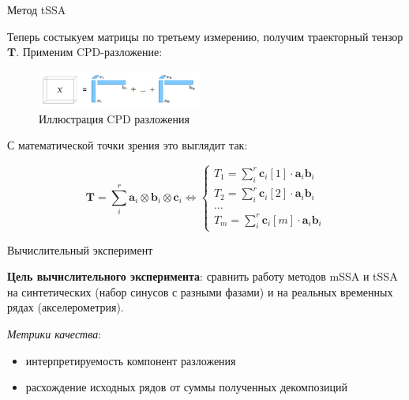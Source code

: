 	\begin{frame}{Метод tSSA}
		
		Теперь состыкуем матрицы по третьему измерению, получим траекторный тензор $ \mathbf{T} $. Применим CPD-разложение:
		
		\begin{figure}[h]
			\centering
			\includegraphics[width=0.48\textwidth, keepaspectratio]{../../figs/cpu_decomp}
			\caption{Иллюстрация CPD разложения}\label{pic:cpu_dec}
		\end{figure}
		
		С математической точки зрения это выглядит так:
		
		\begin{equation*}
			\mathbf{T} = \sum\limits_i^{r} \mathbf{a}_i \otimes \mathbf{b}_i \otimes \mathbf{c}_i \Leftrightarrow \begin{cases}
				T_1 = \sum\limits_i^{r} \mathbf{c}_i[1] \cdot \mathbf{a}_i  \mathbf{b}_i  \\
				T_2 = \sum\limits_i^{r} \mathbf{c}_i[2] \cdot \mathbf{a}_i  \mathbf{b}_i \\
				\ldots \\
				T_m = \sum\limits_i^{r} \mathbf{c}_i[m] \cdot \mathbf{a}_i  \mathbf{b}_i 
			\end{cases}
		\end{equation*}
		
	\end{frame}
	
	\begin{frame}{Вычислительный эксперимент}
		
		\textbf{Цель вычислительного эксперимента}: сравнить работу методов mSSA и tSSA на синтетических (набор синусов с разными фазами) и на реальных временных рядах (акселерометрия). 
		
		\textit{Метрики качества}:
		
		\begin{itemize}
			
			\item интерпретируемость компонент разложения
			
			\item расхождение исходных рядов от суммы полученных декомпозиций
			
		\end{itemize}
		
	\end{frame}
	
